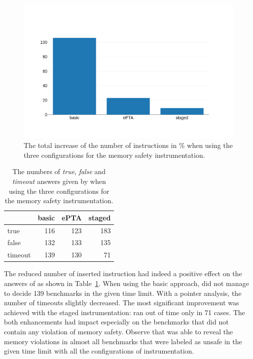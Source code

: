 \begin{figure}[h]
  \includegraphics[width=\textwidth]{charts/bar_chart.png}
  \caption{The total increase of the number of instructions in \% when using
  the three configurations for the memory safety instrumentation.}
  \label{fig:increase_chart}
\end{figure}

\begin{table}[t]
\begin{tabular}{|l || r | r | r|}
 \hline
 & basic & ePTA & staged \\
 \hline
 \hline
 true     & 116 & 123  & 183 \\
 \hline
 false    & 132 & 133  & 135 \\
 \hline
 timeout  & 139 & 130  & 71 \\
 \hline
\end{tabular}
\caption{The numbers of \emph{true}, \emph{false} and \emph{timeout} answers
given by \symbiotic when using the three configurations for the memory safety
instrumentation.}
\label{tab:answers}

\end{table}

The reduced number of inserted instruction had indeed a positive effect on the
answers of \symbiotic as shown in Table~\ref{tab:answers}. When using the basic
approach, \symbiotic did not manage to decide 139 benchmarks in the given time
limit. With a pointer analysis, the number of timeouts slightly decreased. The
most significant improvement was achieved with the staged instrumentation:
\symbiotic ran out of time only in 71 cases. The both enhancements had impact
especially on the benchmarks that did not contain any violation of memory
safety. Observe that \symbiotic was able to reveal the memory violations in
almost all benchmarks that were labeled as unsafe in the given time limit with
all the configurations of instrumentation.


